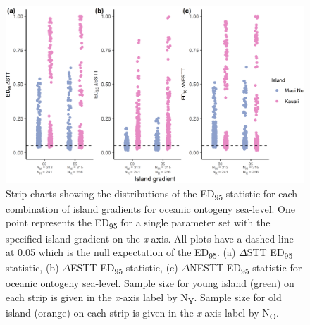 \begin{figure}
    \centering
    \includegraphics{oceanic_ontogeny_sea_level_gradient_nltt.png}
    \caption{Strip charts showing the distributions of the ED\textsubscript{95} statistic for each combination of island gradients for oceanic ontogeny sea-level. One point represents the ED\textsubscript{95} for a single parameter set with the specified island gradient on the \textit{x}-axis. All plots have a dashed line at 0.05 which is the null expectation of the ED\textsubscript{95}. (a) $\Delta$STT ED\textsubscript{95} statistic, (b) $\Delta$ESTT ED\textsubscript{95} statistic, (c) $\Delta$NESTT ED\textsubscript{95} statistic for oceanic ontogeny sea-level. Sample size for young island (green) on each strip is given in the \textit{x}-axis label by N\textsubscript{Y}. Sample size for old island (orange) on each strip is given in the \textit{x}-axis label by N\textsubscript{O}.}
    \label{fig:oceanic_ontogeny_sea_level_gradient_nltt}
\end{figure}


